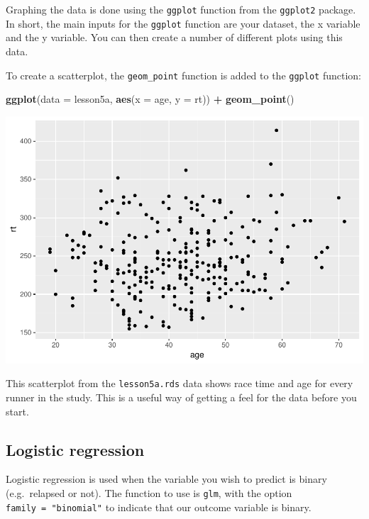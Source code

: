 \documentclass[]{book}
\newenvironment{Shaded}{\begin{snugshade}}{\end{snugshade}}
\newcommand{\DataTypeTok}[1]{\textcolor[rgb]{0.13,0.29,0.53}{#1}}
\newcommand{\KeywordTok}[1]{\textcolor[rgb]{0.13,0.29,0.53}{\textbf{#1}}}
\newcommand{\NormalTok}[1]{#1}
\newcommand{\OperatorTok}[1]{\textcolor[rgb]{0.81,0.36,0.00}{\textbf{#1}}}
\newcommand{\StringTok}[1]{\textcolor[rgb]{0.31,0.60,0.02}{#1}}
\begin{document}
Graphing the data is done using the \texttt{ggplot} function from the \texttt{ggplot2} package. In short, the main inputs for the \texttt{ggplot} function are your dataset, the x variable and the y variable. You can then create a number of different plots using this data.

To create a scatterplot, the \texttt{geom\_point} function is added to the \texttt{ggplot} function:

\begin{Shaded}
\begin{Highlighting}[]
\KeywordTok{ggplot}\NormalTok{(}\DataTypeTok{data =}\NormalTok{ lesson5a,}
       \KeywordTok{aes}\NormalTok{(}\DataTypeTok{x =}\NormalTok{ age, }\DataTypeTok{y =}\NormalTok{ rt)) }\OperatorTok{+}
\StringTok{  }\KeywordTok{geom_point}\NormalTok{()}
\end{Highlighting}
\end{Shaded}

\includegraphics{05-week5_files/figure-latex/section5j-1.pdf}

This scatterplot from the \texttt{lesson5a.rds} data shows race time and age for every runner in the study. This is a useful way of getting a feel for the data before you start.

\hypertarget{logistic-regression}{%
\subsection{Logistic regression}\label{logistic-regression}}

Logistic regression is used when the variable you wish to predict is binary (e.g.~relapsed or not). The function to use is \texttt{glm}, with the option \texttt{family\ =\ "binomial"} to indicate that our outcome variable is binary.
\end{document}

